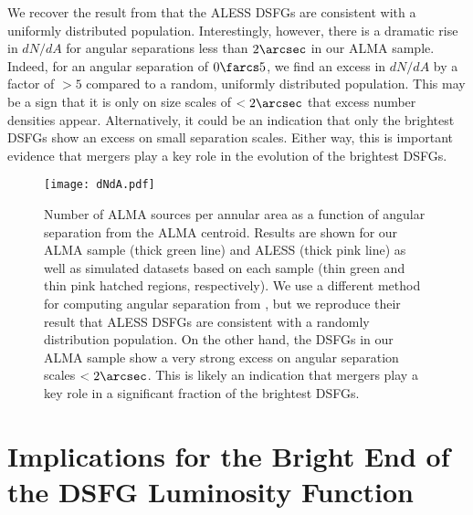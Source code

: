 \documentclass[iop]{emulateapj}
\begin{document}
We recover the result from \citet{Hodge:2013qy} that the ALESS DSFGs are
consistent with a uniformly distributed population.  Interestingly, however,
there is a dramatic rise in $dN/dA$ for angular separations less than
$2\arcsec$ in our ALMA sample.  Indeed, for an angular separation of
$0\farcs5$, we find an excess in $dN/dA$ by a factor of $>5$ compared to a
random, uniformly distributed population.  This may be a sign that it is only
on size scales of $<2\arcsec$ that excess number densities appear.
Alternatively, it could be an indication that only the brightest DSFGs show an
excess on small separation scales.  Either way, this is important evidence that
mergers play a key role in the evolution of the brightest DSFGs.

\begin{figure}[!tbp] 
\texttt{[image: dNdA.pdf]}

\caption{ Number of ALMA sources per annular area as a function of angular
separation from the ALMA centroid.  Results are shown for our ALMA sample
(thick green line) and ALESS (thick pink line) as well as simulated datasets
based on each sample (thin green and thin pink hatched regions, respectively).
We use a different method for computing angular separation from
\citet{Hodge:2013qy}, but we reproduce their result that ALESS DSFGs are
consistent with a randomly distribution population.  On the other hand, the
DSFGs in our ALMA sample show a very strong excess on angular separation scales
$<2\arcsec$.  This is likely an indication that mergers play a key role in a
significant fraction of the brightest DSFGs.  } \label{fig:dNdA}

\end{figure}



\section{Implications for the Bright End of the DSFG Luminosity
Function}\label{sec:discuss}
\end{document}
